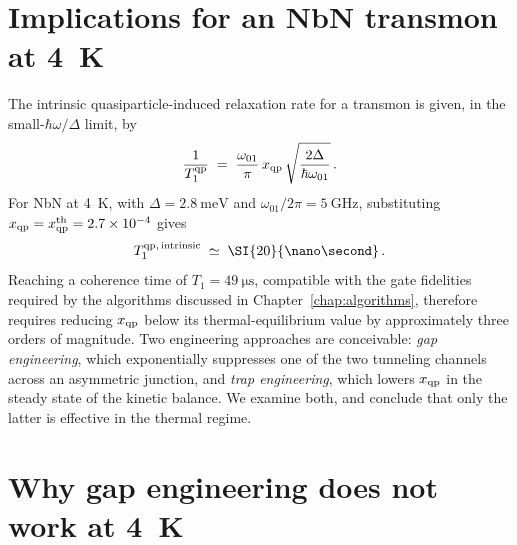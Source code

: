 \section{Implications for an NbN transmon at \SI{4}{\kelvin}}
\label{app:qp:implications}

The intrinsic quasiparticle-induced relaxation rate for a transmon is given,
in the small-$\hbar\omega/\Delta$ limit, by~\cite{Catelani2011QP}
\begin{equation}
  \frac{1}{T_1^{\rm qp}}
  \;=\; \frac{\omega_{01}}{\pi}\,x_{\rm qp}\,
        \sqrt{\frac{2\Delta}{\hbar\omega_{01}}}\,.
  \label{app:qp:eq:T1qp}
\end{equation}
For NbN at \SI{4}{\kelvin}, with $\Delta = \SI{2.8}{\milli\electronvolt}$
and $\omega_{01}/2\pi = \SI{5}{\giga\hertz}$, substituting
$x_{\rm qp} = x_{\rm qp}^{\rm th} = 2.7\times 10^{-4}$ gives
\begin{equation}
  T_1^{\rm qp,\,intrinsic} \;\simeq\; \SI{20}{\nano\second}\,.
  \label{app:qp:eq:T1-intrinsic}
\end{equation}
Reaching a coherence time of $T_1 = \SI{49}{\micro\second}$, compatible with
the gate fidelities required by the algorithms discussed in
Chapter~\ref{chap:algorithms}, therefore requires reducing $x_{\rm qp}$ below its
thermal-equilibrium value by approximately three orders of magnitude. Two
engineering approaches are conceivable: \emph{gap engineering}, which
exponentially suppresses one of the two tunneling channels across an
asymmetric junction, and \emph{trap engineering}, which lowers $x_{\rm qp}$ in the
steady state of the kinetic balance. We examine both, and conclude that
only the latter is effective in the thermal regime.


\section{Why gap engineering does not work at \SI{4}{\kelvin}}
\label{app:qp:gap-fails}

